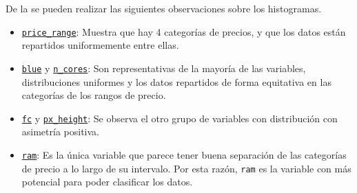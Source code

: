 \documentclass[12pt,twocolumn,a4paper]{apa_article}
\begin{document}
De la  se pueden realizar las siguientes observaciones sobre los histogramas.
\begin{itemize}
  \item \hyperref[fig:histpricerange]{\texttt{price\_range}}: Muestra que hay 4 categorías de precios, y que los datos están repartidos uniformemente entre ellas.
  \item \hyperref[fig:histblue]{\texttt{blue}} y \hyperref[fig:histncores]{\texttt{n\_cores}}: Son representativas de la mayoría de las variables, distribuciones uniformes y los datos repartidos de forma equitativa en las categorías de los rangos de precio.
  \item \hyperref[fig:histfc]{\texttt{fc}} y \hyperref[fig:histpxheight]{\texttt{px\_height}}: Se observa el otro grupo de variables con distribución con asimetría positiva.
  \item \hyperref[fig:ram]{\texttt{ram}}: Es la única variable que parece tener buena separación de las categorías de precio a lo largo de su intervalo. Por esta razón, \texttt{ram} es la variable con más potencial para poder clasificar los datos.
\end{itemize}
\end{document}
